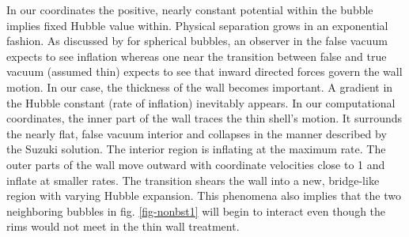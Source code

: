 \documentclass[preprintnumbers,eqsecnum,aps,prd,epsf,showpacs,nofootinbib
]{revtex4}
\begin{document}
In our coordinates the positive, nearly constant potential within the
bubble implies fixed Hubble value within. Physical separation grows in
an exponential fashion.  As discussed by
\cite{Sato:1981gv,Blau:1986cw,Berezin:1987bc} for spherical bubbles,
an observer in the false vacuum expects to see inflation whereas one
near the transition between false and true vacuum (assumed thin)
expects to see that inward directed forces govern the wall motion.  In
our case, the thickness of the wall becomes important. A gradient in
the Hubble constant (rate of inflation) inevitably appears. In our
computational coordinates, the inner part of the wall traces the thin
shell's motion. It surrounds the nearly flat, false vacuum interior
and collapses in the manner described by the Suzuki solution. The
interior region is inflating at the maximum rate. The outer parts of
the wall move outward with coordinate velocities close to 1 and
inflate at smaller rates. The transition shears the wall into a new,
bridge-like region with varying Hubble expansion.
This phenomena also implies that the two neighboring bubbles in
fig. \ref{fig-nonbst1} will begin to interact even though the rims
would not meet in the thin wall treatment.
\end{document}
